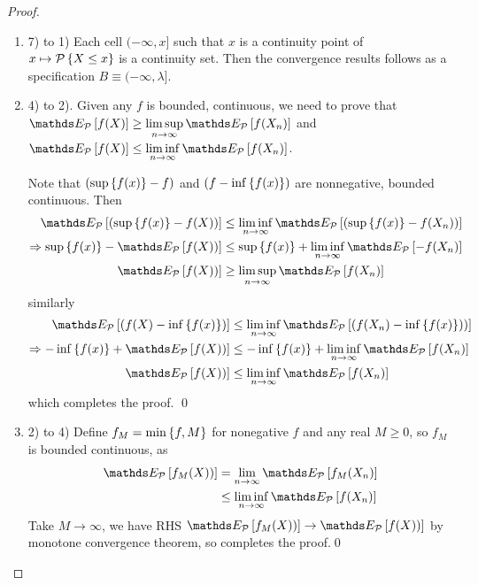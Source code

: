 \documentclass[11pt]{article}
\begin{document}
\begin{itemize}
\begin{proof}
\begin{enumerate}
\item 7) to 1) Each cell $(-\infty, x]$ such that $x$ is a continuity point of $x\mapsto {\mathcal P}\left\{X\le x\right\}$ is a continuity set. Then the convergence results follows as a specification $B\equiv (-\infty, \lambda]$. 

\item 4) to 2).  Given any $f$ is bounded, continuous, we need to prove that $ \E{\cP}{f(X)} \ge \limsup\limits_{n\rightarrow \infty}\E{\cP}{f(X_{n})}$ and $ \E{\cP}{f(X)} \le \liminf\limits_{n\rightarrow \infty}\E{\cP}{f(X_{n})}$.

Note that $(\sup\left\{f(x)\right\} - f)$ and $(f- \inf\left\{f(x)\right\} )$  are nonnegative, bounded  continuous. Then 
\begin{align*}
\E{\cP}{(\sup\set{f(x)} - f(X))} &\le \liminf\limits_{n\rightarrow \infty}\E{\cP}{(\sup\set{f(x)} - f(X_{n}))}\\
\Rightarrow \sup\set{f(x)}- \E{\cP}{f(X))} &\le \sup\set{f(x)}+\liminf\limits_{n\rightarrow \infty}\E{\cP}{ -f(X_{n})}\\
\E{\cP}{f(X))}&\ge \limsup\limits_{n\rightarrow \infty}\E{\cP}{f(X_{n})}
\end{align*} similarly
\begin{align*}
\E{\cP}{(f(X)- \inf\set{f(x)})} &\le \liminf\limits_{n\rightarrow \infty}\E{\cP}{(f(X_{n})- \inf\set{f(x)}))}\\
\Rightarrow -\inf\set{f(x)}+ \E{\cP}{f(X))} &\le -\inf\set{f(x)}+\liminf\limits_{n\rightarrow \infty}\E{\cP}{f(X_{n})}\\
\E{\cP}{f(X))}&\le \liminf\limits_{n\rightarrow \infty}\E{\cP}{f(X_{n})}
\end{align*} which completes the proof. \qed

\item 2) to 4) Define $f_{M} = \min\left\{f, M\right\}$ for nonegative $f$ and any real $M\ge 0$, so $f_{M}$ is bounded continuous, as
\begin{align*}
\E{\cP}{f_{M}(X))}& = \lim\limits_{n\rightarrow \infty}\E{\cP}{f_{M}(X_{n})}\\
&\le \liminf\limits_{n\rightarrow \infty}\E{\cP}{f(X_{n})}
\end{align*} Take $M\rightarrow \infty$, we have RHS $\E{\cP}{f_{M}(X))}\rightarrow \E{\cP}{f(X))}$ by monotone convergence theorem, so completes the proof.\qed
\end{enumerate}
\end{proof}


\end{itemize}
\end{document}
